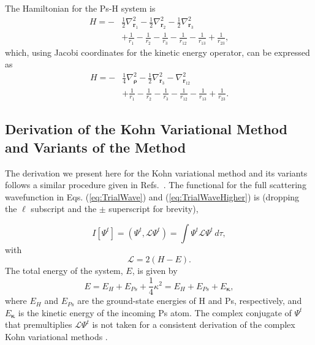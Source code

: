 \documentclass[preprint,showpacs,showkeys,preprintnumbers,amsmath,amssymb,longbibliography,pra,aps]{revtex4-1}
\begin{document}
The Hamiltonian for the Ps-H system is
\begin{align}
H = -&\frac{1}{2} \nabla_{\bm{r}_1}^2 - \frac{1}{2} \nabla_{\bm{r}_2}^2 - \frac{1}{2}
  \nabla_{\bm{r}_3}^2  \nonumber \\
&+ \frac{1}{r_1} - \frac{1}{r_2} - \frac{1}{r_3} - \frac{1}{r_{12}} -
  \frac{1}{r_{13}}+\frac {1}{r_{23}},
\label{eq:Hamiltonian1}
\end{align}
which, using Jacobi coordinates for the kinetic energy operator, can be
expressed as
\begin{align}
H = -&\frac{1}{4} \nabla_{\bm{\rho}}^2 - \frac{1}{2} \nabla_{\bm{r}_3}^2 -
  \nabla_{\bm{r}_{12}}^2  \nonumber \\
&+ \frac{1}{r_1} - \frac{1}{r_2} - \frac{1}{r_3} - \frac{1}{r_{12}} -
  \frac{1}{r_{13}}+\frac{1}{r_{23}}.
\label{eq:Hamiltonian2}
\end{align}


\subsection{Derivation of the Kohn Variational Method and Variants of the Method}
\label{sec:Kohn}
The derivation we present here for the Kohn variational method and its variants
follows a similar procedure given in
Refs.~\cite{Lucchese1989,Cooper2010,Armour1991,VanReethThesis}.
The functional for the full scattering wavefunction in Eqs. (\ref{eq:TrialWave}) and
(\ref{eq:TrialWaveHigher}) is (dropping the $\ell$ subscript and the $\pm$ 
superscript for brevity),

\begin{equation}
I[\Psi^t] = \left(\Psi^t, \mathcal{L} \Psi^t \right) = \int \Psi^t \mathcal{L}
  \Psi^t \,d\tau,
\label{eq:IlDefPsi}
\end{equation}
with
\begin{equation}
\mathcal{L} = 2(H - E).
\label{eq:LDef}
\end{equation}
The total energy of the system, $E$, is given by
\begin{equation}
\label{eq:TotalEnergy}
E = E_H + E_{Ps} + \frac{1}{4}\kappa^2 = E_H + E_{Ps} + E_{\bm \kappa},
\end{equation}
where $E_H$ and $E_{Ps}$ are the ground-state energies of H and Ps, 
respectively,
and $E_{\bm \kappa}$ is the kinetic energy of the incoming Ps atom.
The complex conjugate of $\Psi^t$ that premultiplies $\mathcal{L} \Psi^t$
is not taken for a consistent derivation of the complex Kohn variational
methods \cite{Cooper2010,Lucchese1989}.
\end{document}
